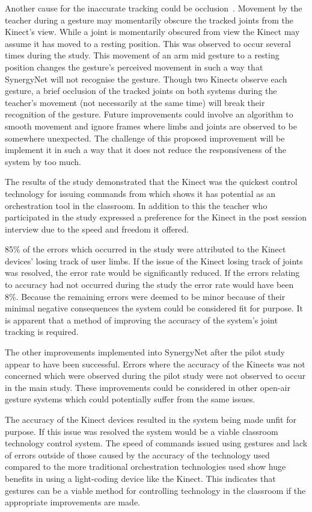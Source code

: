 \documentclass[link]{IWCOMP}
\begin{document}
Another cause for the inaccurate tracking could be occlusion~\cite{Meng2012}.
Movement by the teacher during a gesture may momentarily obscure the tracked joints from the Kinect's view.
While a joint is momentarily obscured from view the Kinect may assume it has moved to a resting position.
This was observed to occur several times during the study.
This movement of an arm mid gesture to a resting position changes the gesture's perceived movement in such a way that SynergyNet will not recognise the gesture.
Though two Kinects observe each gesture, a brief occlusion of the tracked joints on both systems during the teacher's movement (not necessarily at the same time) will break their recognition of the gesture.
Future improvements could involve an algorithm to smooth movement and ignore frames where limbs and joints are observed to be somewhere unexpected.
The challenge of this proposed improvement will be implement it in such a way that it does not reduce the responsiveness of the system by too much.

The results of the study demonstrated that the Kinect was the quickest control technology for issuing commands from which shows it has potential as an orchestration tool in the classroom.
In addition to this the teacher who participated in the study expressed a preference for the Kinect in the post session interview due to the speed and freedom it offered.

85\% of the errors which occurred in the study were attributed to the Kinect devices' losing track of user limbs.
If the issue of the Kinect losing track of joints was resolved, the error rate would be significantly reduced.
If the errors relating to accuracy had not occurred during the study the error rate would have been 8\%.
Because the remaining errors were deemed to be minor because of their minimal negative consequences the system could be considered fit for purpose.
It is apparent that a method of improving the accuracy of the system's joint tracking is required.

The other improvements implemented into SynergyNet after the pilot study appear to have been successful.
Errors where the accuracy of the Kinects was not concerned which were observed during the pilot study were not observed to occur in the main study.
These improvements could be considered in other open-air gesture systems which could potentially suffer from the same issues.

The accuracy of the Kinect devices resulted in the system being made unfit for purpose.
If this issue was resolved the system would be a viable classroom technology control system.
The speed of commands issued using gestures and lack of errors outside of those caused by the accuracy of the technology used compared to the more traditional orchestration technologies used show huge benefits in using a light-coding device like the Kinect.
This indicates that gestures can be a viable method for controlling technology in the classroom if the appropriate improvements are made.
\end{document}

